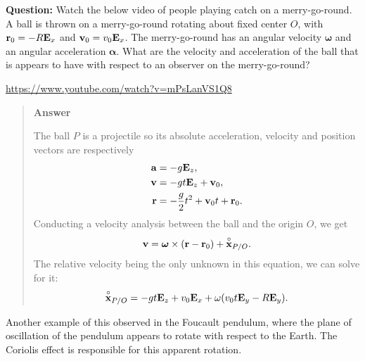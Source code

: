\documentclass[
  letterpaper,
  DIV=11,
  numbers=noendperiod]{scrreprt}
\newcommand{\bomega}{\boldsymbol{\omega}}
\newcommand{\balpha}{\boldsymbol{\alpha}}
\begin{document}
\begin{tcolorbox}[enhanced jigsaw, arc=.35mm, bottomrule=.15mm, bottomtitle=1mm, breakable, colback=white, colbacktitle=quarto-callout-tip-color!10!white, colframe=quarto-callout-tip-color-frame, coltitle=black, left=2mm, leftrule=.75mm, opacityback=0, opacitybacktitle=0.6, rightrule=.15mm, title=\textcolor{quarto-callout-tip-color}{\faLightbulb}\hspace{0.5em}{Think!}, titlerule=0mm, toprule=.15mm, toptitle=1mm]

\textbf{Question:} Watch the below video of people playing catch on a
merry-go-round. A ball is thrown on a merry-go-round rotating about
fixed center \(O\), with \({\bf r}_0 = -R{\bf E}_x\) and
\({\bf v}_0 = v_0{\bf E}_x\). The merry-go-round has an angular velocity
\(\bomega\) and an angular acceleration \(\balpha\). What are the
velocity and acceleration of the ball that is appears to have with
respect to an observer on the merry-go-round?

\url{https://www.youtube.com/watch?v=mPsLanVS1Q8}

\begin{quote}
\textbf{Answer}

The ball \(P\) is a projectile so its absolute acceleration, velocity
and position vectors are respectively \begin{align}
    {\bf a} &= -g{\bf E}_z,\\
    {\bf v} &= -gt{\bf E}_z+{\bf v}_0,\\
    {\bf r} &= -\frac{g}{2}t^2+{\bf v}_0t+{\bf r}_0.
\end{align} Conducting a velocity analysis between the ball and the
origin \(O\), we get \begin{align}
    {\bf v} = \bomega\times({\bf r}-{\bf r}_0)+\overset{\circ}{\bf x}_{P/O}.
\end{align} The relative velocity being the only unknown in this
equation, we can solve for it: \begin{align}
    \overset{\circ}{\bf x}_{P/O} = -gt{\bf E}_z+v_0{\bf E}_x+\omega(v_0t{\bf E}_y-R{\bf E}_y).
\end{align}
\end{quote}

\end{tcolorbox}

Another example of this observed in the Foucault pendulum, where the
plane of oscillation of the pendulum appears to rotate with respect to
the Earth. The Coriolis effect is responsible for this apparent
rotation.
\end{document}
